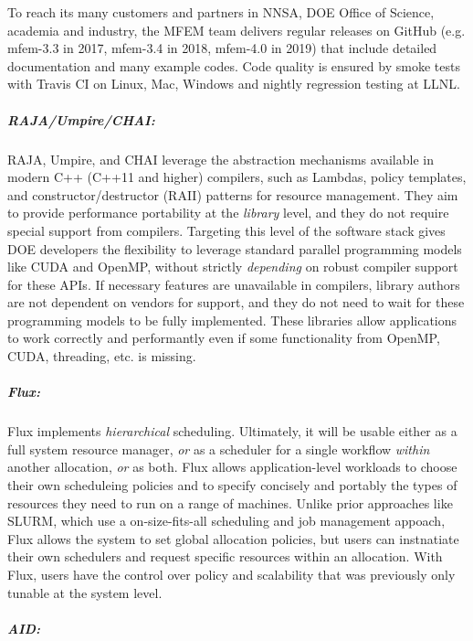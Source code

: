 To reach its many customers and partners in NNSA, DOE Office of Science,
academia and industry, the MFEM team delivers regular releases on GitHub
(e.g. mfem-3.3 in 2017, mfem-3.4 in 2018, mfem-4.0 in 2019) that include
detailed documentation and many example codes.  Code quality is ensured
by smoke tests with Travis CI on Linux, Mac, Windows and nightly
regression testing at LLNL.

\subparagraph{RAJA/Umpire/CHAI:}
RAJA, Umpire, and CHAI leverage the abstraction mechanisms available in
modern C++ (C++11 and higher) compilers, such as Lambdas, policy
templates, and constructor/destructor (RAII) patterns for resource
management.  They aim to provide performance portability at the {\it
library} level, and they do not require special support from compilers.
Targeting this level of the software stack gives DOE developers the
flexibility to leverage standard parallel programming models like CUDA
and OpenMP, without strictly {\it depending} on robust compiler support
for these APIs.  If necessary features are unavailable in compilers,
library authors are not dependent on vendors for support, and they do not
need to wait for these programming models to be fully implemented.  These
libraries allow applications to work correctly and performantly even if
some functionality from OpenMP, CUDA, threading, etc. is missing.

\subparagraph{Flux:}
Flux implements {\it hierarchical} scheduling.  Ultimately, it will be
usable either as a full system resource manager, {\it or} as a scheduler
for a single workflow {\it within} another allocation, {\it or} as both.
Flux allows application-level workloads to choose their own scheduleing
policies and to specify concisely and portably the types of resources
they need to run on a range of machines.  Unlike prior approaches like
SLURM, which use a on-size-fits-all scheduling and job management
appoach, Flux allows the system to set global allocation policies, but
users can instnatiate their own schedulers and request specific resources
within an allocation.  With Flux, users have the control over policy and
scalability that was previously only tunable at the system level.

\subparagraph{AID:}

